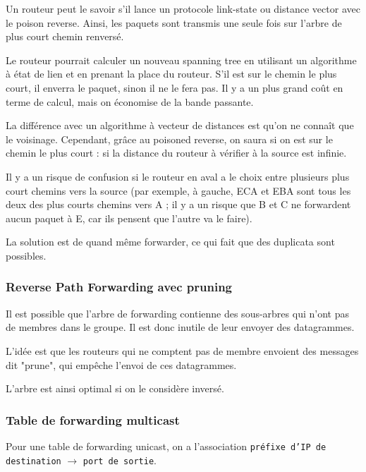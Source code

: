 		
		
			Un routeur peut le savoir s'il lance un protocole link-state ou distance vector avec le poison reverse. Ainsi, les paquets sont transmis une seule fois sur l'arbre de plus court chemin renversé.
			
			Le routeur pourrait calculer un nouveau spanning tree en utilisant un algorithme à état de lien et en prenant la place du routeur. S'il est sur le chemin le plus court, il enverra le paquet, sinon il ne le fera pas. Il y a un plus grand coût en terme de calcul, mais on économise de la bande passante.
				 
			La différence avec un algorithme à vecteur de distances est qu'on ne connaît que le voisinage. Cependant, grâce au poisoned reverse, on saura si on est sur le chemin le plus court : si la distance du routeur à vérifier à la source est infinie.
		
			Il y a un risque de confusion si le routeur en aval a le choix entre plusieurs plus court chemins vers la source (par exemple, à gauche, ECA et EBA sont tous les deux des plus courts chemins vers A ; il y a un risque que B et C ne forwardent aucun paquet à E, car ils pensent que l'autre va le faire).
			
			La solution est de quand même forwarder, ce qui fait que des duplicata sont possibles.
				
			\subsubsection{Reverse Path Forwarding avec pruning}
			
			Il est possible que l'arbre de forwarding contienne des sous-arbres qui n'ont pas de membres dans le groupe. Il est donc inutile de leur envoyer des datagrammes.
			
			L'idée est que les routeurs qui ne comptent pas de membre envoient des messages dit "prune", qui empêche l'envoi de ces datagrammes.
			
					
			L'arbre est ainsi optimal si on le considère inversé.
		
			\subsubsection{Table de forwarding multicast}
			
			Pour une table de forwarding unicast, on a l'association \texttt{préfixe d'IP de destination} $\rightarrow$ \texttt{port de sortie}.
			
